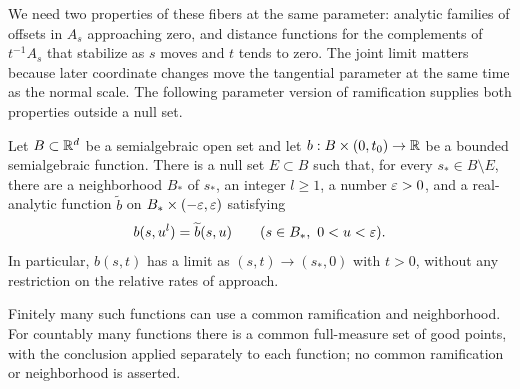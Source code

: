 We need two properties of these fibers at the same parameter: analytic
families of offsets in $A_s$ approaching zero, and distance functions
for the complements of $t^{-1}A_s$ that stabilize as $s$ moves and
$t$ tends to zero.  The joint limit matters because later coordinate
changes move the tangential parameter at the same time as the normal
scale.  The following parameter version of ramification supplies both
properties outside a null set.

\begin{lemma}
\label{lem:ramified-parameters}
Let $B\subset\mathbb R^d$ be a semialgebraic open set and let
$b:B\times(0,t_0)\to\mathbb R$ be a bounded semialgebraic function.  There is a
null set $E\subset B$ such that, for every $s_*\in B\setminus E$, there
are a neighborhood $B_*$ of $s_*$, an integer $l\geq1$, a number
$\varepsilon>0$, and a real-analytic function $\widetilde b$ on
$B_*\times(-\varepsilon,\varepsilon)$ satisfying
\[
 b(s,u^l)=\widetilde b(s,u)
 \qquad(s\in B_*,\ 0<u<\varepsilon).
\]
In particular, $b(s,t)$ has a limit as $(s,t)\to(s_*,0)$ with $t>0$,
without any restriction on the relative rates of approach.

Finitely many such functions can use a common ramification and
neighborhood.  For countably many functions there is a common full-measure
set of good points, with the conclusion applied separately to each
function; no common ramification or neighborhood is asserted.
\end{lemma}

